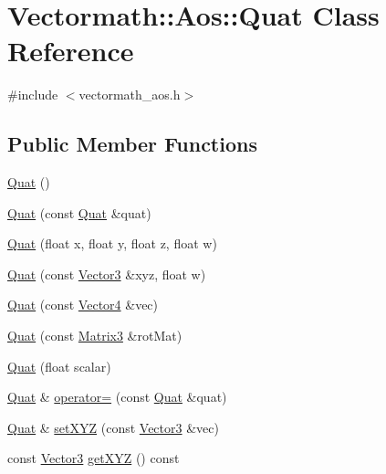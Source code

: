 \hypertarget{classVectormath_1_1Aos_1_1Quat}{\section{Vectormath\-:\-:Aos\-:\-:Quat Class Reference}
\label{classVectormath_1_1Aos_1_1Quat}
}


{\ttfamily \#include $<$vectormath\-\_\-aos.\-h$>$}

\subsection*{Public Member Functions}
\begin{DoxyCompactItemize}
\item 
\hyperlink{classVectormath_1_1Aos_1_1Quat_add864d8b2993555c949c27708da98492}{Quat} ()
\item 
\hyperlink{classVectormath_1_1Aos_1_1Quat_a9dcf3e36798a1d72e898dce8d0693858}{Quat} (const \hyperlink{classVectormath_1_1Aos_1_1Quat}{Quat} \&quat)
\item 
\hyperlink{classVectormath_1_1Aos_1_1Quat_af6d1f2dbba730b5dd155c24400873161}{Quat} (float x, float y, float z, float w)
\item 
\hyperlink{classVectormath_1_1Aos_1_1Quat_a3c4ef0ffb3cc139c06340426d90e84b5}{Quat} (const \hyperlink{classVectormath_1_1Aos_1_1Vector3}{Vector3} \&xyz, float w)
\item 
\hyperlink{classVectormath_1_1Aos_1_1Quat_af61eecf13838a8cb72b0c694beae971b}{Quat} (const \hyperlink{classVectormath_1_1Aos_1_1Vector4}{Vector4} \&vec)
\item 
\hyperlink{classVectormath_1_1Aos_1_1Quat_a9df4aeb15a7af04f4ba446059a099a71}{Quat} (const \hyperlink{classVectormath_1_1Aos_1_1Matrix3}{Matrix3} \&rot\-Mat)
\item 
\hyperlink{classVectormath_1_1Aos_1_1Quat_a5cc6e6d27580904b9cc4d023134763e2}{Quat} (float scalar)
\item 
\hyperlink{classVectormath_1_1Aos_1_1Quat}{Quat} \& \hyperlink{classVectormath_1_1Aos_1_1Quat_a0d7baa5238b7bce21ef27629b62e349b}{operator=} (const \hyperlink{classVectormath_1_1Aos_1_1Quat}{Quat} \&quat)
\item 
\hyperlink{classVectormath_1_1Aos_1_1Quat}{Quat} \& \hyperlink{classVectormath_1_1Aos_1_1Quat_a1ee991d2930ce1b3bdab9e012c27f130}{set\-X\-Y\-Z} (const \hyperlink{classVectormath_1_1Aos_1_1Vector3}{Vector3} \&vec)
\item 
const \hyperlink{classVectormath_1_1Aos_1_1Vector3}{Vector3} \hyperlink{classVectormath_1_1Aos_1_1Quat_a8796319c36689f614f7ac703894d60f3}{get\-X\-Y\-Z} () const 

\end{DoxyCompactItemize}
